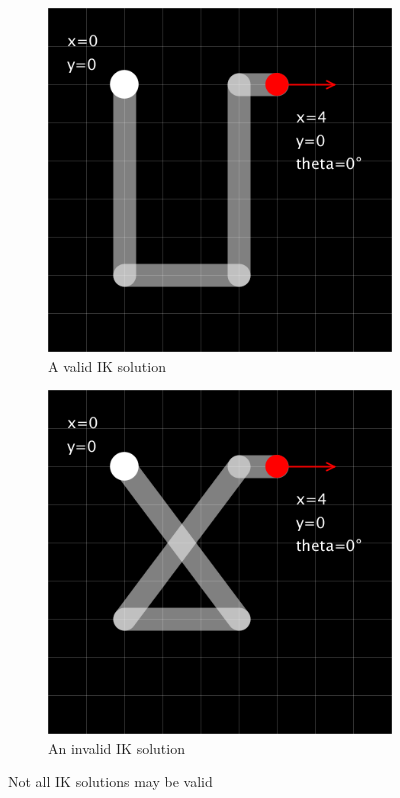 \begin{figure}[h]
    \centering
    \begin{subfigure}[b]{0.45\textwidth}
        \includegraphics[width=\textwidth]{figures/ik-valid.png}
        \caption{A valid IK solution}
        \label{fig:ik-valid}
    \end{subfigure}
    \hfill
    \begin{subfigure}[b]{0.45\textwidth}
        \includegraphics[width=\textwidth]{figures/ik-invalid.png}
        \caption{An invalid IK solution}
        \label{fig:ik-invalid}
    \end{subfigure}
    \caption{Not all IK solutions may be valid}
    \label{fig:ik-null-space}
\end{figure}

